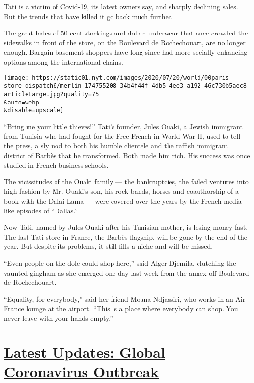 Tati is a victim of Covid-19, its latest owners say, and sharply
declining sales. But the trends that have killed it go back much
further.

The great bales of 50-cent stockings and dollar underwear that once
crowded the sidewalks in front of the store, on the Boulevard de
Rochechouart, are no longer enough. Bargain-basement shoppers have long
since had more socially enhancing options among the international
chains.

\texttt{[image: https://static01.nyt.com/images/2020/07/20/world/00paris-store-dispatch6/merlin\_174755208\_34b4f44f-4db5-4ee3-a192-46c730b5aec8-articleLarge.jpg?quality=75\\\&auto=webp\\\&disable=upscale]}

``Bring me your little thieves!'' Tati's founder, Jules Ouaki, a Jewish
immigrant from Tunisia who had fought for the Free French in World War
II, used to tell the press, a sly nod to both his humble clientele and
the raffish immigrant district of Barbès that he transformed. Both made
him rich. His success was once studied in French business schools.

The vicissitudes of the Ouaki family --- the bankruptcies, the failed
ventures into high fashion by Mr. Ouaki's son, his rock bands, horses
and coauthorship of a book with the Dalai Lama --- were covered over the
years by the French media like episodes of ``Dallas.''

Now Tati, named by Jules Ouaki after his Tunisian mother, is losing
money fast. The last Tati store in France, the Barbès flagship, will be
gone by the end of the year. But despite its problems, it still fills a
niche and will be missed.

``Even people on the dole could shop here,'' said Alger Djemila,
clutching the vaunted gingham as she emerged one day last week from the
annex off Boulevard de Rochechouart.

``Equality, for everybody,'' said her friend Moana Ndjassiri, who works
in an Air France lounge at the airport. ``This is a place where
everybody can shop. You never leave with your hands empty.''

\hypertarget{latest-updates-global-coronavirus-outbreak}{%
\section{\texorpdfstring{\href{https://www.nytimes.com/2020/08/01/world/coronavirus-covid-19.html?action=click\&pgtype=Article\&state=default\&region=MAIN_CONTENT_1\&context=storylines_live_updates}{Latest
Updates: Global Coronavirus
Outbreak}}{Latest Updates: Global Coronavirus Outbreak}}\label{latest-updates-global-coronavirus-outbreak}}

